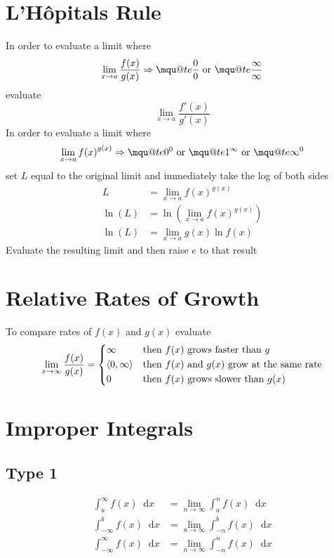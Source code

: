 \documentclass[12pt]{article}
\makeatletter
\renewcommand*{\implies}{\Rightarrow}
\newcommand*{\fixmath}{\makebox{}\vspace{\glueexpr-\baselineskip-\abovedisplayskip}}
\newcommand*{\D}[1]{\mathop{}\!\mathrm{d} #1}
\newcommand{\mquote}[1]{{\mathpalette\mqu@te{#1}}}
\newcommand{\mqu@te}[2]{%
  \sbox0{\(\m@th#1\text{``}\)}%
  \sbox1{\(\m@th#1\text{''}\)}%
  \sbox2{\(\m@th#1#2\)}%
  \ifdim\ht2>\ht0
    \raisebox{\dimexpr\ht2-\height}{\box0}%
    #2%
    \raisebox{\dimexpr\ht2-\height}{\box1}%
  \else
    \box0 #2\box1
  \fi
}
\newenvironment{rmbskip}{\setlength{\belowdisplayskip}{0pt}\ignorespaces}%
  {\ignorespacesafterend}
\newenvironment{rmskip}{\setlength{\abovedisplayskip}{0pt}%
  \setlength{\belowdisplayskip}{0pt}\fixmath\ignorespaces}%
  {\ignorespacesafterend}
\makeatother
\begin{document}
\section*{L'H\^{o}pitals Rule}
In order to evaluate a limit where
\[
  \lim_{x \to a} \frac{f(x)}{g(x)} \implies \mquote{\frac{0}{0}} \text{ or }
  \mquote{\frac{\infty}{\infty}}
\]
evaluate
\[
  \lim_{x \to a} \frac{f'(x)}{g'(x)}
\]
In order to evaluate a limit where
\[
  \lim_{x \to a} {f(x)}^{g(x)} \implies \mquote{0^0} \text{ or }
  \mquote{1^\infty} \text{ or } \mquote{\infty^0}
\]
set \(L\) equal to the original limit and immediately take the log of both
sides
\begin{align*}
  L &= \lim_{x \to a} {f(x)}^{g(x)}\\
  \ln(L) &= \ln\left(\lim_{x \to a} {f(x)}^{g(x)}\right)\\
  \ln(L) &= \lim_{x \to a} g(x) \ln f(x)
\end{align*}
Evaluate the resulting limit and then raise \(e\) to that result
\section*{Relative Rates of Growth}
To compare rates of \(f(x)\) and \(g(x)\) evaluate
\begin{rmbskip}
  \[
    \lim_{x \to \infty} \frac{f(x)}{g(x)} =
    \begin{dcases*}
      \infty & then \(f(x)\) grows faster than \(g\)\\
      \left<0, \infty\right> & then \(f(x)\) and \(g(x)\) grow at the same
        rate\\
      0 & then \(f(x)\) grows slower than \(g(x)\)
    \end{dcases*}
  \]
\end{rmbskip}
\section*{Improper Integrals}
\subsection*{Type 1}
\begin{rmskip}
  \begin{align*}
    \int_a^\infty f(x) \D{x} &= \lim_{n \to \infty} \int_a^n f(x) \D{x}\\
    \int_{-\infty}^b f(x) \D{x} &= \lim_{n \to \infty} \int_{-n}^b f(x) \D{x}\\
    \int_{-\infty}^\infty f(x) \D{x} &= \lim_{n \to \infty} \int_{-n}^n f(x)
      \D{x}
  \end{align*}
\end{rmskip}
\end{document}

